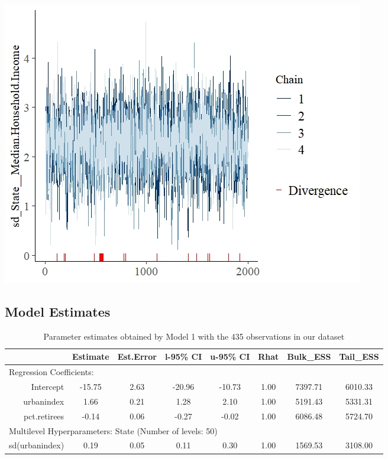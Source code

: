 \documentclass[12pt]{article}
\begin{document}
\includegraphics[scale = 1.4]{trace_plots/trace_model4_part3.jpeg}


\FloatBarrier


\subsection*{Model Estimates}

\begin{table}[ht]
	\centering
	 \begin{adjustbox}{max width=\textwidth}
	\begin{tabular}{rccccccc}
		\hline
		& Estimate & Est.Error & l-95\% CI & u-95\% CI & Rhat & Bulk\_ESS & Tail\_ESS \\ 
		\hline
		\multicolumn{8}{l}{Regression Coefficients:} \\
		Intercept & -15.75 & 2.63 & -20.96 & -10.73 & 1.00 & 7397.71 & 6010.33 \\ 
		urbanindex & 1.66 & 0.21 & 1.28 & 2.10 & 1.00 & 5191.43 & 5331.31 \\ 
		pct.retirees & -0.14 & 0.06 & -0.27 & -0.02 & 1.00 & 6086.48 & 5724.70 \\
		\midrule
		\multicolumn{8}{l}{Multilevel Hyperparameters: State (Number of levels: 50)}                       \\ 
		sd(urbanindex) & 0.19 & 0.05 & 0.11 & 0.30 & 1.00 & 1569.53 & 3108.00 \\ 
		\hline
	\end{tabular}
		\end{adjustbox}
	\caption{Parameter estimates obtained by Model 1 with the 435 observations in our dataset}
	\label{tab:model1}
\end{table}
\end{document}
